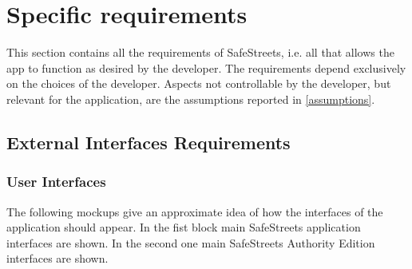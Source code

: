 \documentclass{article}
\begin{document}
	\section{Specific requirements}
		This section contains all the requirements of SafeStreets, i.e. all that allows the app to function as desired by the developer. The requirements depend exclusively on the choices of the developer. Aspects not controllable by the developer, but relevant for the application, are the assumptions reported in \ref{assumptions}.
		
		\subsection{External Interfaces Requirements}
		
			\subsubsection{User Interfaces}
		    The following mockups give an approximate idea of how the interfaces of the application should appear. In the fist block main SafeStreets application interfaces are shown. In the second one main SafeStreets Authority Edition interfaces are shown.
			
\end{document}
